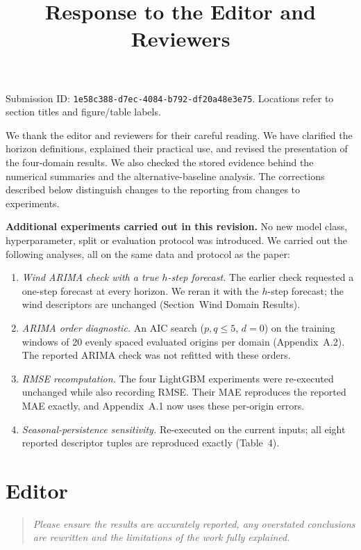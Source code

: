 \documentclass[11pt,a4paper]{article}
\title{\textbf{Response to the Editor and Reviewers}}
\author{}
\date{}
\let\originalsection\section
\renewcommand{\section}{\Needspace{12\baselineskip}\originalsection}
\newenvironment{reviewcomment}
  {\begin{quote}\itshape}
  {\end{quote}}
\begin{document}
\maketitle
Submission ID: \texttt{1e58c388-d7ec-4084-b792-df20a48e3e75}.
Locations refer to section titles and figure/table labels.

We thank the editor and reviewers for their careful reading. We have
clarified the horizon definitions, explained their practical use, and
revised the presentation of the four-domain results. We also checked the
stored evidence behind the numerical summaries and the alternative-baseline
analysis. The corrections described below distinguish changes to the
reporting from changes to experiments.

\textbf{Additional experiments carried out in this revision.} No new model
class, hyperparameter, split or evaluation protocol was introduced. We carried out the following
analyses, all on the same data and protocol as the paper:
\begin{enumerate}[leftmargin=*,itemsep=2pt]
\item \emph{Wind ARIMA check with a true $h$-step forecast.} The earlier check requested a one-step forecast at
every horizon. We reran it with the $h$-step forecast; the wind descriptors are unchanged (Section~Wind Domain Results).
\item \emph{ARIMA order diagnostic.} An AIC search ($p,q\le5$, $d=0$) on the training windows of 20 evenly spaced
evaluated origins per domain (Appendix~A.2). The reported ARIMA check was not refitted with these orders.
\item \emph{RMSE recomputation.} The four LightGBM experiments were re-executed unchanged while also recording RMSE.
Their MAE reproduces the reported MAE exactly, and Appendix~A.1 now uses these per-origin errors.
\item \emph{Seasonal-persistence sensitivity.} Re-executed on the current inputs; all eight reported
descriptor tuples are reproduced exactly (Table~4).
\end{enumerate}


\section*{Editor}

\begin{reviewcomment}
Please ensure the results are accurately reported, any overstated conclusions are rewritten and the limitations of the work fully explained.
\end{reviewcomment}
\end{document}

